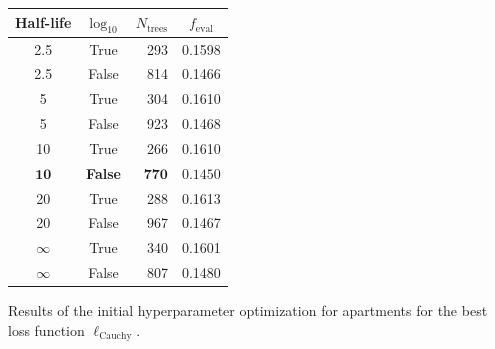 

\begin{margintable}
  \begin{tabular}{@{}ccrc@{}}
    Half-life & $\log_{10}$ & $N_\mathrm{trees}$ & $f_\mathrm{eval}$ \\
    \midrule
    \num{2.5} & True & \num{293} & \num{0.1598} \\
    \num{2.5} & False & \num{814} & \num{0.1466} \\
    \num{5} & True & \num{304} & \num{0.1610} \\
    \num{5} & False & \num{923} & \num{0.1468} \\
    \num{10} & True & \num{266} & \num{0.1610} \\
    $\mathbf{10}$ & \textbf{False} & $\mathbf{770}$ & $\mathbf{0.1450}$ \\
    \num{20} & True & \num{288} & \num{0.1613} \\
    \num{20} & False & \num{967} & \num{0.1467} \\
    $\infty$ & True & \num{340} & \num{0.1601} \\
    $\infty$ & False & \num{807} & \num{0.1480} \\
  \end{tabular}
  \caption{\label{tab:h:HPO_initial_Cauchy-ejerlejlighed}Results of the initial hyperparameter optimization for apartments for the best loss function $\ell_\mathrm{Cauchy}$.}
\end{margintable}


